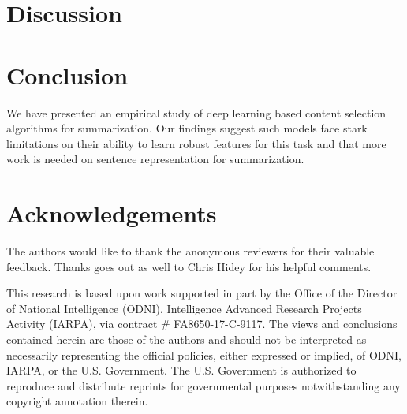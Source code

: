 \documentclass[11pt,a4paper]{article}
\begin{document}
\section{Discussion}



\section{Conclusion}
We have presented an empirical study of deep learning based content selection
algorithms for summarization. Our findings suggest such models face stark limitations on their ability to learn robust features for this task and that 
more work is needed on sentence representation for summarization.


\section{Acknowledgements}
The authors would like to thank the anonymous reviewers for their valuable 
feedback. Thanks goes out as well to Chris Hidey for his helpful comments.

This research is based upon work supported in part by the Office of the 
Director of National Intelligence (ODNI), Intelligence Advanced Research 
Projects Activity (IARPA), via contract \# FA8650-17-C-9117. The views and 
conclusions contained herein are those of the authors and should not be 
interpreted as necessarily representing the official policies, either 
expressed or implied, of ODNI, IARPA, or the U.S. Government. The U.S. 
Government is authorized to reproduce and distribute reprints for governmental 
purposes notwithstanding any copyright annotation therein. 







\newpage
\onecolumn
\appendix



\makeappendix
\end{document}
